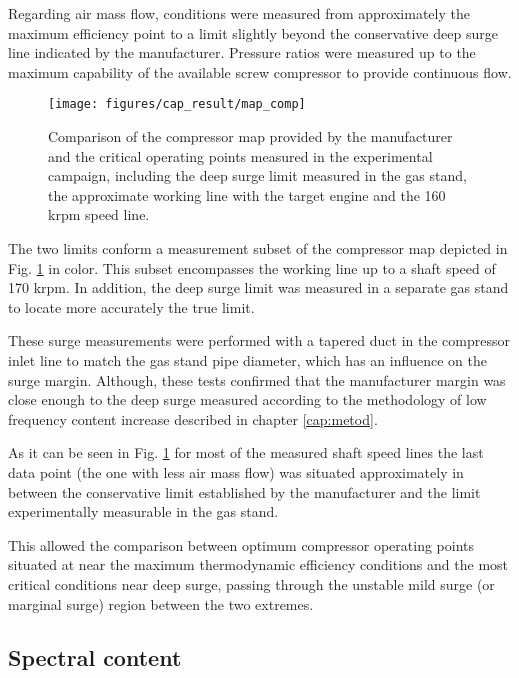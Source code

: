 Regarding air mass flow, conditions were measured from approximately the maximum efficiency point to a limit slightly beyond the conservative deep surge line indicated by the manufacturer. Pressure ratios were measured up to the maximum capability of the available screw compressor to provide continuous flow.

\begin{figure}[tbh!]
\centering
\vspace{3mm}
\texttt{[image: figures/cap\_result/map\_comp]}
\caption{Comparison of the compressor map provided by the manufacturer and the critical operating points measured in the experimental campaign, including the deep surge limit measured in the gas stand, the approximate working line with the target engine and the 160 krpm speed line.}
\label{fig:result_map_comp}
\end{figure}

The two limits conform a measurement subset of the compressor map depicted in Fig. \ref{fig:result_map_comp} in color. This subset encompasses the working line up to a shaft speed of 170 krpm. In addition, the deep surge limit was measured in a separate gas stand to locate more accurately the true limit.

These surge measurements were performed with a tapered duct in the compressor inlet line to match the gas stand pipe diameter, which has an influence on the surge margin. Although, these tests confirmed that the manufacturer margin was close enough to the deep surge measured according to the methodology of low frequency content increase described in chapter \ref{cap:metod}. 

As it can be seen in Fig. \ref{fig:result_map_comp} for most of the measured shaft speed lines the last data point (the one with less air mass flow) was situated approximately in between the conservative limit established by the manufacturer and the limit experimentally measurable in the gas stand. 

This allowed the comparison between optimum compressor operating points situated at near the maximum thermodynamic efficiency conditions and the most critical conditions near deep surge, passing through the unstable mild surge (or marginal surge) region between the two extremes.

\subsection{Spectral content}

